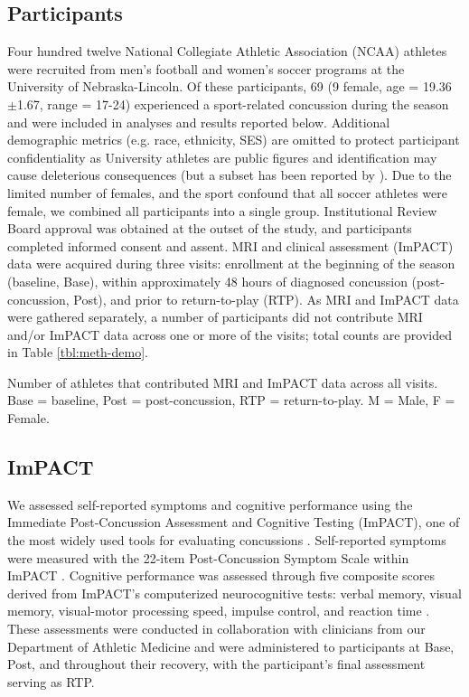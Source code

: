 \documentclass[12pt]{article}
\begin{document}
\subsection{Participants}
\label{ssec:meth-part}
Four hundred twelve National Collegiate Athletic Association (NCAA) athletes were recruited from men's football and women's soccer programs at the University of Nebraska-Lincoln. Of these participants, 69 (9 female, age = 19.36 $\pm$1.67, range = 17-24) experienced a sport-related concussion during the season and were included in analyses and results reported below. Additional demographic metrics (e.g. race, ethnicity, SES) are omitted to protect participant confidentiality as University athletes are public figures and identification may cause deleterious consequences (but a subset has been reported by \cite{bouchard2024ConcussionRelatedDisruptionsHub}). Due to the limited number of females, and the sport confound that all soccer athletes were female, we combined all participants into a single group. Institutional Review Board approval was obtained at the outset of the study, and participants completed informed consent and assent. MRI and clinical assessment (ImPACT) data were acquired during three visits: enrollment at the beginning of the season (baseline, Base), within approximately 48 hours of diagnosed concussion (post-concussion, Post), and prior to return-to-play (RTP). As MRI and ImPACT data were gathered separately, a number of participants did not contribute MRI and/or ImPACT data across one or more of the visits; total counts are provided in Table \ref{tbl:meth-demo}.

\begin{table}[H]
	\centering
	\scriptsize
	
	\caption{Number of athletes that contributed MRI and ImPACT data across all visits. Base = baseline, Post = post-concussion, RTP = return-to-play. M = Male, F = Female.}
	\label{tbl:meth-demo}
\end{table}


\subsection{ImPACT}
\label{ssec:meth-imp}
We assessed self-reported symptoms and cognitive performance using the Immediate Post-Concussion Assessment and Cognitive Testing (ImPACT), one of the most widely used tools for evaluating concussions \parencite{lovell2005ImPACT200540,dessy2017ReviewAssessmentScales}. Self-reported symptoms were measured with the 22-item Post-Concussion Symptom Scale within ImPACT \parencite{lovell2006MeasurementSymptomsFollowing}. Cognitive performance was assessed through five composite scores derived from ImPACT's computerized neurocognitive tests: verbal memory, visual memory, visual-motor processing speed, impulse control, and reaction time \parencite{lovell2005ImPACT200540}. These assessments were conducted in collaboration with clinicians from our Department of Athletic Medicine and were administered to participants at Base, Post, and throughout their recovery, with the participant's final assessment serving as RTP.
\end{document}
